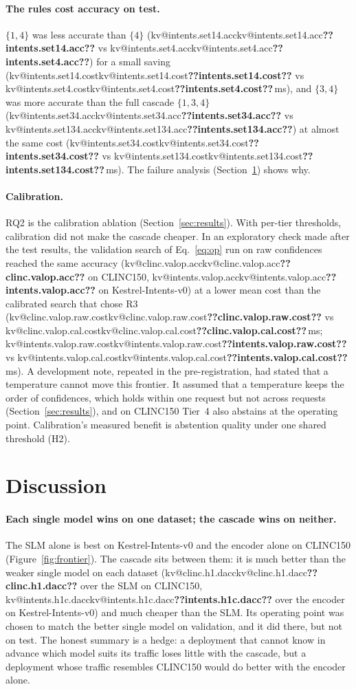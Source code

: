 \documentclass[11pt,a4paper]{article}
\makeatletter
\DeclareRobustCommand{\kv}[1]{\ifcsname kv@#1\endcsname\csname kv@#1\endcsname\else\textbf{??#1??}\fi}
\newcommand{\ms}{\,ms}
\newcommand{\tierset}[1]{$\{#1\}$}
\makeatother
\begin{document}
\paragraph{The rules cost accuracy on test.} \tierset{1,4} was less accurate than \tierset{4} (\kv{intents.set14.acc}
vs \kv{intents.set4.acc}) for a small saving (\kv{intents.set14.cost} vs \kv{intents.set4.cost}\ms), and
\tierset{3,4} was more accurate than the full cascade \tierset{1,3,4} (\kv{intents.set34.acc} vs
\kv{intents.set134.acc}) at almost the same cost (\kv{intents.set34.cost} vs \kv{intents.set134.cost}\ms). The
failure analysis (Section~\ref{sec:discussion}) shows why.

\paragraph{Calibration.} RQ2 is the calibration ablation (Section~\ref{sec:results}). With per-tier thresholds,
calibration did not make the cascade cheaper. In an exploratory check made after the test results, the validation
search of Eq.~\eqref{eq:op} run on raw confidences reached the same accuracy (\kv{clinc.valop.acc} on CLINC150,
\kv{intents.valop.acc} on Kestrel-Intents-v0) at a lower mean cost than the calibrated search that chose R3
(\kv{clinc.valop.raw.cost} vs \kv{clinc.valop.cal.cost}\ms; \kv{intents.valop.raw.cost} vs
\kv{intents.valop.cal.cost}\ms). A development note, repeated in the pre-registration, had stated that a temperature
cannot move this frontier. It assumed that a temperature keeps the order of confidences, which holds within one request
but not across requests (Section~\ref{sec:results}), and on CLINC150 Tier~4 also abstains at the operating point.
Calibration's measured benefit is abstention quality under one shared threshold (H2).

\section{Discussion}\label{sec:discussion}

\paragraph{Each single model wins on one dataset; the cascade wins on neither.} The SLM alone is best on
Kestrel-Intents-v0 and the encoder alone on CLINC150 (Figure~\ref{fig:frontier}). The cascade sits between them: it
is much better than the weaker single model on each dataset (\kv{clinc.h1.dacc} over the SLM on CLINC150,
\kv{intents.h1c.dacc} over the encoder on Kestrel-Intents-v0) and much cheaper than the SLM. Its operating point was
chosen to match the better single model on validation, and it did there, but not on test. The honest summary is a
hedge: a deployment that cannot know in advance which model suits its traffic loses little with the cascade, but a
deployment whose traffic resembles CLINC150 would do better with the encoder alone.
\end{document}
